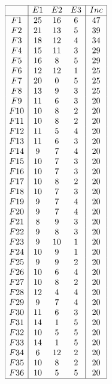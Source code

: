 \documentclass[12pt]{article}
\begin{document}
\begin{equation*}
\begin{array}{|c|ccc|c|}
\hline
&E1&E2&E3&Inc\\
\hline
F1&25&16&6&47\\
F2&21&13&5&39\\
F3&18&12&4&34\\
F4&15&11&3&29\\
F5&16&8&5&29\\
F6&12&12&1&25\\
F7&20&0&5&25\\
F8&13&9&3&25\\
F9&11&6&3&20\\
F10&10&8&2&20\\
F11&10&8&2&20\\
F12&11&5&4&20\\
F13&11&6&3&20\\
F14&9&7&4&20\\
F15&10&7&3&20\\
F16&10&7&3&20\\
F17&10&8&2&20\\
F18&10&7&3&20\\
F19&9&7&4&20\\
F20&9&7&4&20\\
F21&8&9&3&20\\
F22&9&8&3&20\\
F23&9&10&1&20\\
F24&10&9&1&20\\
F25&9&9&2&20\\
F26&10&6&4&20\\
F27&10&8&2&20\\
F28&12&4&4&20\\
F29&9&7&4&20\\
F30&11&6&3&20\\
F31&14&1&5&20\\
F32&10&5&5&20\\
F33&14&1&5&20\\
F34&6&12&2&20\\
F35&10&8&2&20\\
F36&10&5&5&20\\
\hline
\end{array}
\end{equation*}
\end{document}
